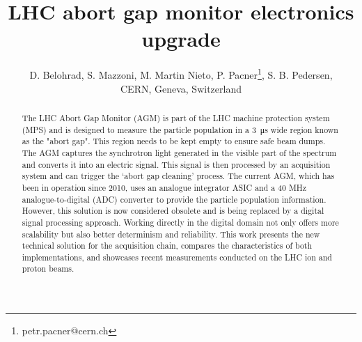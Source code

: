 



\title{LHC abort gap monitor electronics upgrade}

\author{D. Belohrad, S. Mazzoni, M. Martin Nieto, P. Pacner\thanks{petr.pacner@cern.ch}, S. B. Pedersen,\\
CERN, Geneva, Switzerland}
	
\maketitle

\begin{abstract}
    The LHC Abort Gap Monitor (AGM) is part of the LHC machine protection
    system (MPS) and is designed to measure the particle population in a \SI{3}{\micro\second}
    wide region known as the "abort gap". This region needs to be kept empty to
    ensure safe beam dumps. The AGM captures the synchrotron light generated in
    the visible part of the spectrum and converts it into an electric signal.
    This signal is then processed by an acquisition system and can trigger the
    ‘abort gap cleaning’ process. The current AGM, which has been in operation
    since 2010, uses an analogue integrator ASIC and a 40 MHz
    analogue-to-digital (ADC) converter to provide the particle population
    information. However, this solution is now considered obsolete and is being
    replaced by a digital signal processing approach. Working directly in the
    digital domain not only offers more scalability but also better determinism
    and reliability. This work presents the new technical solution for the
    acquisition chain, compares the characteristics of both implementations,
    and showcases recent measurements conducted on the LHC ion and proton
    beams.
\end{abstract}

